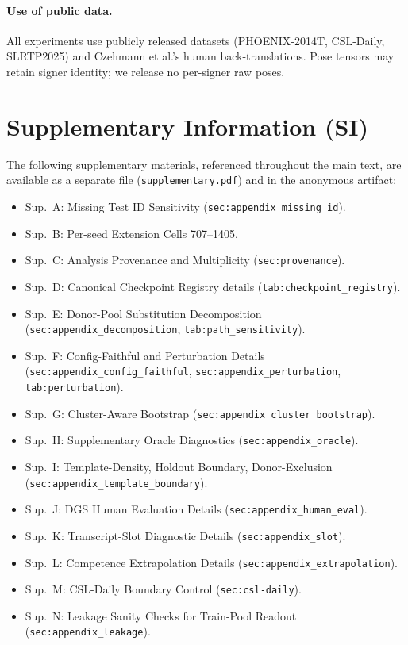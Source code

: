 \documentclass[pdflatex,sn-chicago]{sn-jnl}
\begin{document}
\paragraph{Use of public data.}
All experiments use publicly released datasets (PHOENIX-2014T, CSL-Daily, SLRTP2025) and Czehmann et al.'s human back-translations. Pose tensors may retain signer identity; we release no per-signer raw poses.
\appendix
\section*{Supplementary Information (SI)}
The following supplementary materials, referenced throughout the main text, are available as a separate file (\texttt{supplementary.pdf}) and in the anonymous artifact:
\begin{itemize}\itemsep0pt
\item Sup.~A: Missing Test ID Sensitivity (\texttt{sec:appendix\_missing\_id}).
\item Sup.~B: Per-seed Extension Cells 707--1405.
\item Sup.~C: Analysis Provenance and Multiplicity (\texttt{sec:provenance}).
\item Sup.~D: Canonical Checkpoint Registry details (\texttt{tab:checkpoint\_registry}).
\item Sup.~E: Donor-Pool Substitution Decomposition (\texttt{sec:appendix\_decomposition}, \texttt{tab:path\_sensitivity}).
\item Sup.~F: Config-Faithful and Perturbation Details (\texttt{sec:appendix\_config\_faithful}, \texttt{sec:appendix\_perturbation}, \texttt{tab:perturbation}).
\item Sup.~G: Cluster-Aware Bootstrap (\texttt{sec:appendix\_cluster\_bootstrap}).
\item Sup.~H: Supplementary Oracle Diagnostics (\texttt{sec:appendix\_oracle}).
\item Sup.~I: Template-Density, Holdout Boundary, Donor-Exclusion (\texttt{sec:appendix\_template\_boundary}).
\item Sup.~J: DGS Human Evaluation Details (\texttt{sec:appendix\_human\_eval}).
\item Sup.~K: Transcript-Slot Diagnostic Details (\texttt{sec:appendix\_slot}).
\item Sup.~L: Competence Extrapolation Details (\texttt{sec:appendix\_extrapolation}).
\item Sup.~M: CSL-Daily Boundary Control (\texttt{sec:csl-daily}).
\item Sup.~N: Leakage Sanity Checks for Train-Pool Readout (\texttt{sec:appendix\_leakage}).
\end{itemize}
\end{document}
